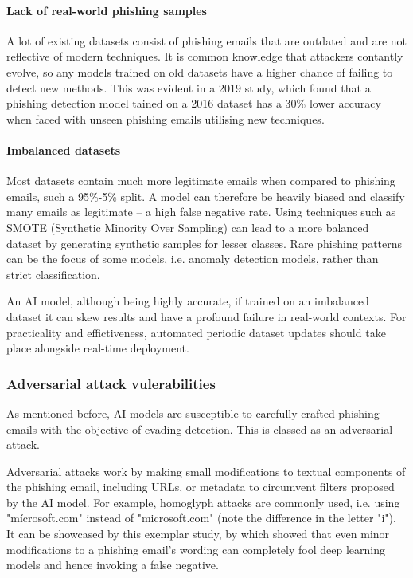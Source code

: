 \paragraph{Lack of real-world phishing samples}
A lot of existing datasets consist of phishing emails that are outdated and are not reflective of modern techniques. It is common knowledge that attackers contantly evolve, so any models trained on old datasets have a higher chance of failing to detect new methods. This was evident in a 2019 study, which found that a phishing detection model tained on a 2016 dataset has a 30\% lower accuracy when faced with unseen phishing emails utilising new techniques.

\paragraph{Imbalanced datasets}
Most datasets contain much more legitimate emails when compared to phishing emails, such a 95\%-5\% split. A model can therefore be heavily biased and classify many emails as legitimate -- a high false negative rate. Using techniques such as SMOTE (Synthetic Minority Over Sampling) can lead to a more balanced dataset by generating synthetic samples for lesser classes. Rare phishing patterns can be the focus of some models, i.e. anomaly detection models, rather than strict classification.\newline

\noindent An AI model, although being highly accurate, if trained on an imbalanced dataset it can skew results and have a profound failure in real-world contexts. For practicality and effictiveness, automated periodic dataset updates should take place alongside real-time deployment.

\subsubsection*{Adversarial attack vulerabilities}
As mentioned before, AI models are susceptible to carefully crafted phishing emails with the objective of evading detection. This is classed as an adversarial attack.\newline

\noindent Adversarial attacks work by making small modifications to textual components of the phishing email, including URLs, or metadata to circumvent filters proposed by the AI model. For example, homoglyph attacks are commonly used, i.e. using "m\'{i}crosoft.com" instead of "microsoft.com" (note the difference in the letter "i"). It can be showcased by this exemplar study, by which showed that even minor modifications to a phishing email's wording can completely fool deep learning models and hence invoking a false negative.\newline

